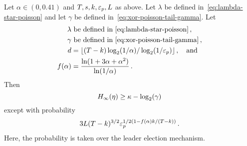 \begin{theorem}\label{thm:beacon-poisson}
	Let $\alpha \in (0, 0.41)$ and $T, s, k, \mathsf{\varepsilon}_p, L$ as above. 
	Let $\lambda$ be defined in~\eqref{eq:lambda-star-poisson} and 
	let $\gamma$ be defined in~\eqref{eq:xor-poisson-tail-gamma}. 
	Let 
  \begin{align*}
      \lambda &\ \text{be defined in~\eqref{eq:lambda-star-poisson}}
      \,, \\
      \gamma &\ \text{be defined in~\eqref{eq:xor-poisson-tail-gamma}}
      \,, \\
      d &= \lfloor (T - k) \log_2(1/\alpha)/\log_2(1/\mathsf{\varepsilon}_p)\rfloor
      \,,\quad\text{and}\\
      f(\alpha) &= \frac{\ln(1 + 3 \alpha + \alpha^2)}{\ln(1/\alpha)}
      \,.
  \end{align*}
	Then 
	$$
		H_\infty(\eta) \geq \kappa - \log_2(\gamma)
  $$
  except with probability 
  $$ 
      3 L (T - k)^{3/2} \mathsf{\varepsilon}_p^{1/2 \left( 1 - f(\alpha)k/(T-k) \right)}
		\,.
	$$
	Here, the probability is taken over 
	the leader election mechanism.
\end{theorem}


